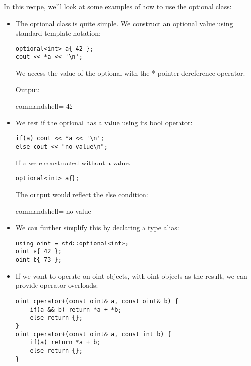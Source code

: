 In this recipe, we'll look at some examples of how to use the optional class:

\begin{itemize}
\item 
The optional class is quite simple. We construct an optional value using standard template notation:

\begin{lstlisting}[style=styleCXX]
optional<int> a{ 42 };
cout << *a << '\n';
\end{lstlisting}

We access the value of the optional with the * pointer dereference operator.

Output:

\begin{tcblisting}{commandshell={}}
42
\end{tcblisting}

\item 
We test if the optional has a value using its bool operator:

\begin{lstlisting}[style=styleCXX]
if(a) cout << *a << '\n';
else cout << "no value\n";
\end{lstlisting}

If a were constructed without a value:

\begin{lstlisting}[style=styleCXX]
optional<int> a{};
\end{lstlisting}

The output would reflect the else condition:

\begin{tcblisting}{commandshell={}}
no value
\end{tcblisting}

\item 
We can further simplify this by declaring a type alias:

\begin{lstlisting}[style=styleCXX]
using oint = std::optional<int>;
oint a{ 42 };
oint b{ 73 };
\end{lstlisting}

\item 
If we want to operate on oint objects, with oint objects as the result, we can provide operator overloads:

\begin{lstlisting}[style=styleCXX]
oint operator+(const oint& a, const oint& b) {
	if(a && b) return *a + *b;
	else return {};
}
oint operator+(const oint& a, const int b) {
	if(a) return *a + b;
	else return {};
}
\end{lstlisting}


\end{itemize}
